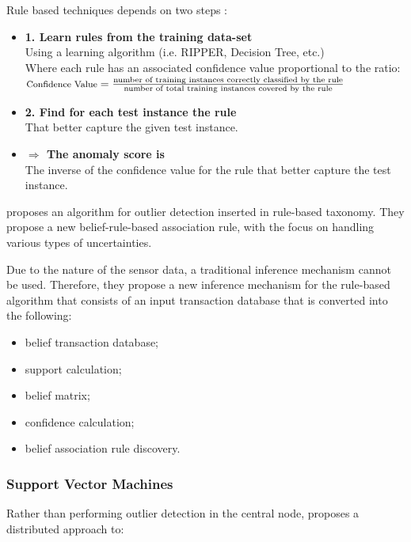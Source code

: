 Rule based techniques depends on two steps \cite{gen:chandola:2009}:

\begin{itemize}
	\item \textbf{1. Learn rules from the training data-set}\\
	Using a learning algorithm (i.e. RIPPER, Decision Tree, etc.)\\
	Where each rule has an associated confidence value 	proportional to the ratio:\\
	{\centering	$\text{\footnotesize Confidence Value} = \frac{\text{number of training instances correctly classified by the rule}}{\text{number of total training instances covered by the rule}}$
	}
	
	\item \textbf{2. Find for each test instance the rule}\\
	That better capture the given test instance.
	
	\item \textbf{$\Rightarrow$ The anomaly score is}\\
	The inverse of the confidence value for the rule that better capture the test instance.
	
\end{itemize}

\cite{class:islam:2016} proposes an algorithm for outlier detection inserted in rule-based taxonomy. They propose a new belief-rule-based association rule, with the focus on handling various types of uncertainties. 

Due to the nature of the sensor data, a traditional inference mechanism cannot be used. Therefore, they propose a new inference mechanism for the rule-based algorithm that consists of an input transaction database that is converted into the following:
\begin{itemize}
	\setlength\itemsep{-0.5em}
	\item belief transaction database;
	\item support calculation;
	\item belief matrix;
	\item confidence calculation;
	\item belief association rule discovery.
	
\end{itemize}


\vspace{1.5em}

\subsubsection{Support Vector Machines}
\label{subsec:svm}
Rather than performing outlier detection in the central node, \cite{class:rajasegarar:2007} proposes a 
distributed approach to:

